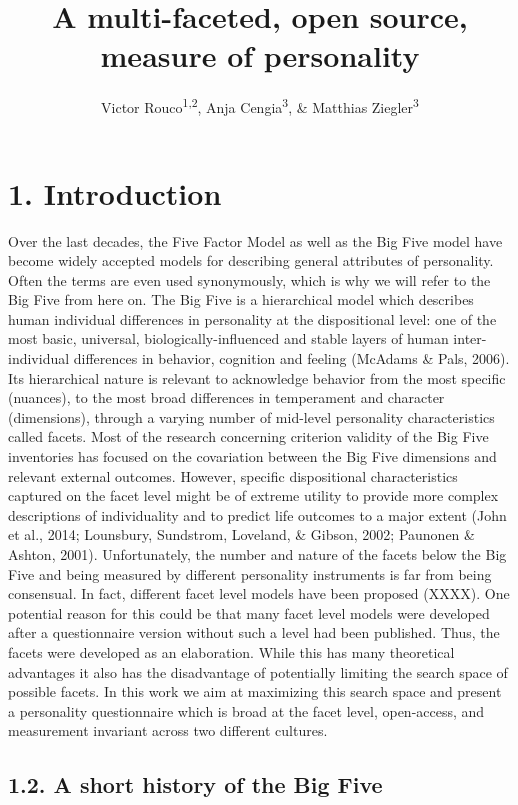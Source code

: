 \documentclass[,man,floatsintext]{apa6}
\title{A multi-faceted, open source, measure of personality}
\author{Victor Rouco\textsuperscript{1,2}, Anja Cengia\textsuperscript{3}, \&
Matthias Ziegler\textsuperscript{3}}
\date{}
\affiliation{
\vspace{0.5cm}
\textsuperscript{1} Universitat de Barcelona\\\textsuperscript{2} Institut de Neurociencies Barcelona\\\textsuperscript{3} Humboldt Universität zu Berlin}
\theoremstyle{definition}
\theoremstyle{definition}
\theoremstyle{definition}
\theoremstyle{remark}
\begin{document}
\maketitle

\hypertarget{introduction}{%
\section{1. Introduction}\label{introduction}}

Over the last decades, the Five Factor Model as well as the Big Five
model have become widely accepted models for describing general
attributes of personality. Often the terms are even used synonymously,
which is why we will refer to the Big Five from here on. The Big Five is
a hierarchical model which describes human individual differences in
personality at the dispositional level: one of the most basic,
universal, biologically-influenced and stable layers of human
inter-individual differences in behavior, cognition and feeling (McAdams
\& Pals, 2006). Its hierarchical nature is relevant to acknowledge
behavior from the most specific (nuances), to the most broad differences
in temperament and character (dimensions), through a varying number of
mid-level personality characteristics called facets. Most of the
research concerning criterion validity of the Big Five inventories has
focused on the covariation between the Big Five dimensions and relevant
external outcomes. However, specific dispositional characteristics
captured on the facet level might be of extreme utility to provide more
complex descriptions of individuality and to predict life outcomes to a
major extent (John et al., 2014; Lounsbury, Sundstrom, Loveland, \&
Gibson, 2002; Paunonen \& Ashton, 2001). Unfortunately, the number and
nature of the facets below the Big Five and being measured by different
personality instruments is far from being consensual. In fact, different
facet level models have been proposed (XXXX). One potential reason for
this could be that many facet level models were developed after a
questionnaire version without such a level had been published. Thus, the
facets were developed as an elaboration. While this has many theoretical
advantages it also has the disadvantage of potentially limiting the
search space of possible facets. In this work we aim at maximizing this
search space and present a personality questionnaire which is broad at
the facet level, open-access, and measurement invariant across two
different cultures.

\hypertarget{a-short-history-of-the-big-five}{%
\subsection{1.2. A short history of the Big
Five}\label{a-short-history-of-the-big-five}}
\end{document}
